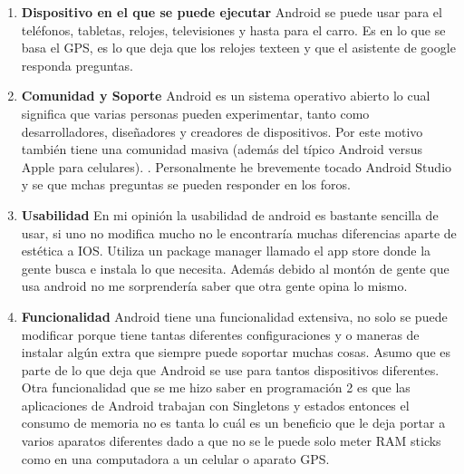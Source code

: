 \documentclass[stu, 12pt, letterpaper, donotrepeattitle, floatsintext, natbib, helv]{apa7}
\begin{document}
\begin{enumerate}
    \item \textbf{Dispositivo en el que se puede ejecutar}
    Android se puede usar para el teléfonos, tabletas, relojes, televisiones y hasta para el carro. Es en lo que se basa el GPS, es lo que deja que los relojes texteen y que el asistente de google responda preguntas.

    \item \textbf{Comunidad y Soporte}
    Android es un sistema operativo abierto lo cual significa que varias personas pueden experimentar, tanto como desarrolladores, diseñadores y creadores de dispositivos. Por este motivo también tiene una comunidad masiva (además del típico Android versus Apple para celulares). \cite{androidCommunity}. Personalmente he brevemente tocado Android Studio y se que mchas preguntas se pueden responder en los foros.


    \item \textbf{Usabilidad}
    En mi opinión la usabilidad de android es bastante sencilla de usar, si uno no modifica mucho no le encontraría muchas diferencias aparte de estética a IOS. Utiliza un package manager llamado el app store donde la gente busca e instala lo que necesita. Además debido al montón de gente que usa android no me sorprendería saber que otra gente opina lo mismo. 

    \item \textbf{Funcionalidad}
    Android tiene una funcionalidad extensiva, no solo se puede modificar porque tiene tantas diferentes configuraciones y o maneras de instalar algún extra que siempre puede soportar muchas cosas. Asumo que es parte de lo que deja que Android se use para tantos dispositivos diferentes. Otra funcionalidad que se me hizo saber en programación 2 es que las aplicaciones de Android trabajan con Singletons y estados entonces el consumo de memoria no es tanta lo cuál es un beneficio que le deja portar a varios aparatos diferentes dado a que no se le puede solo meter RAM sticks como en una computadora a un celular o aparato GPS.


\end{enumerate}
\end{document}
